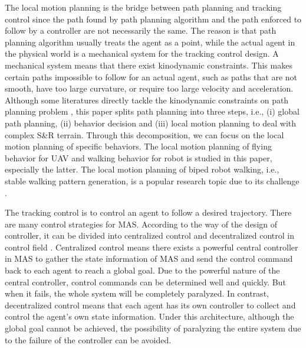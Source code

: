 \documentclass{ieeeaccess}
\begin{document}

The local motion planning is the bridge between path planning and tracking control since the path found by path planning algorithm and the path enforced to follow by a controller are not necessarily the same. The reason is that path planning algorithm usually treats the agent as a point, while the actual agent in the physical world is a mechanical system for the tracking control design. A mechanical system means that there exist kinodynamic constraints. This makes certain paths impossible to follow for an actual agent, such as paths that are not smooth, have too large curvature, or require too large velocity and acceleration. Although some literatures directly tackle the kinodynamic constraints on path planning problem \cite{9384209}, this paper splits path planning into three steps, i.e., (i) global path planning, (ii) behavior decision and (iii) local motion planning to deal with complex S\&R terrain. Through this decomposition, we can focus on the local motion planning of specific behaviors. The local motion planning of flying behavior for UAV and walking behavior for robot is studied in this paper, especially the latter. The local motion planning of biped robot walking, i.e., stable walking pattern generation, is a popular research topic due to its challenge \cite{olcay2017design}.

The tracking control is to control an agent to follow a desired trajectory. There are many control strategies for MAS. According to the way of the design of controller, it can be divided into centralized control and decentralized control in control field \cite{8931370}. Centralized control means there exists a powerful central controller in MAS to gather the state information of MAS and send the control command back to each agent to reach a global goal. Due to the powerful nature of the central controller, control commands can be determined well and quickly. But when it fails, the whole system will be completely paralyzed. In contrast, decentralized control means that each agent has its own controller to collect and control the agent's own state information. Under this architecture, although the global goal cannot be achieved, the possibility of paralyzing the entire system due to the failure of the controller can be avoided.
\end{document}
